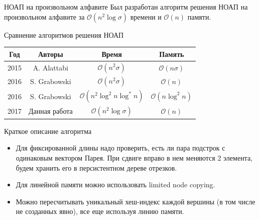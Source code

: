 \documentclass[hyperref=unicode,graphics=pdflatex,12pt]{beamer}
\begin{document}
\begin{frame}{НОАП на произвольном алфавите}
Был разработан алгоритм решения НОАП на произвольном алфавите
за $\mathcal{O}(n^2 \log \sigma)$ времени и $\mathcal{O}(n)$ памяти.

\vspace{0.5cm}

Сравнение алгоритмов решения НОАП

\begin{center}
\begin{tabular}{|c|c|c|c|}
\hline
Год & Авторы & Время & Память \\
\hline
2015 & A. Alattabi & $\mathcal{O}(n^2 \sigma)$ & $\mathcal{O}(n \sigma)$ \\
\hline
2016 & S. Grabowski & $\mathcal{O}(n^2 \sigma)$ & $\mathcal{O}(n)$ \\
\hline
2016 & S. Grabowski & $\mathcal{O}(n^2 \log^2 n \log^* n)$ & $\mathcal{O}(n \log^2 n)$ \\
\hline
2017 & Данная работа & $\mathcal{O}(n^2 \log \sigma)$ & $\mathcal{O}(n)$ \\
\hline
\end{tabular}
\end{center}
\end{frame}
      
\begin{frame}{Краткое описание алгоритма}
\vspace{0.5cm}
\hspace{0.5cm}
\begin{itemize}
\item Для фиксированной длины надо проверить, есть ли пара подстрок с одинаковым вектором Парея. При сдвиге вправо в нем меняются 2 элемента, будем хранить его в персистентном дереве отрезков.
\item<2-> Для линейной памяти можно использовать limited node copying.
\item<3-> Можно пересчитывать уникальный хеш-индекс каждой вершины (в том числе не созданных явно), все еще используя линию памяти.
\end{itemize}
\end{frame}
\end{document}
